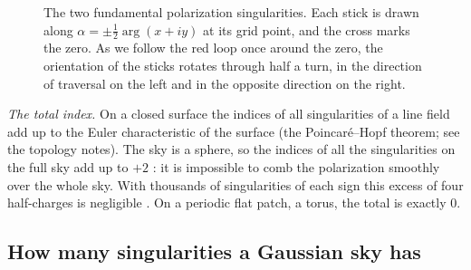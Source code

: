 \begin{figure}[htbp]
\centering
{}
\caption{The two fundamental polarization singularities. Each stick is drawn along $\alpha=\pm\frac12\arg(x+iy)$ at its grid point, and the cross marks the zero. As we follow the red loop once around the zero, the orientation of the sticks rotates through half a turn, in the direction of traversal on the left and in the opposite direction on the right.}
\label{T3a:fig:defects}
\end{figure}

\emph{The total index.} On a closed surface the indices of all singularities of a line field add up to the Euler characteristic of the surface (the Poincar\'e--Hopf theorem; see the topology notes). The sky is a sphere, so the indices of all the singularities on the full sky add up to $+2$ \cite{VachaspatiLue2003}: it is impossible to comb the polarization smoothly over the whole sky. With thousands of singularities of each sign this excess of four half-charges is negligible \cite{HutererVachaspati2005}. On a periodic flat patch, a torus, the total is exactly $0$.

\subsection{How many singularities a Gaussian sky has}
\label{T3a:sec:density}

